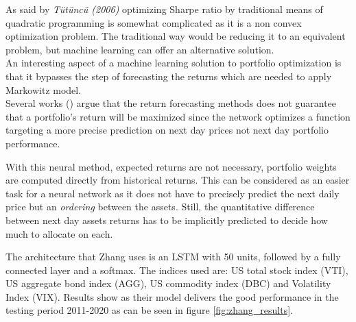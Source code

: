 As said by \textit{T{\"u}t{\"u}nc{\"u} (2006)} \cite{cornuejols2006optimization} optimizing Sharpe ratio by traditional means of quadratic programming is somewhat complicated as it is a non convex optimization problem. The traditional way would be reducing it to an equivalent problem, but machine learning can offer an alternative solution. \\


An interesting aspect of a machine learning solution to portfolio optimization is that it bypasses the step of forecasting the returns which are needed to apply Markowitz model. \\
Several works (\cite{moody2001learning, moody1998performance, zhang2019deep}) argue that the return forecasting methods does not guarantee that a portfolio's return will be maximized since the network optimizes a function targeting a more precise prediction on next day prices not next day portfolio performance.

\hfill \break

With this neural method, expected returns are not necessary, portfolio weights are computed directly from historical returns. This can be considered as an easier task for a neural network as it does not have to precisely predict the next daily price but an \textit{ordering} between the assets. Still, the quantitative difference between next day assets returns has to be implicitly predicted to decide how much to allocate on each.

\hfill \break

The architecture that Zhang uses is an LSTM with 50 units, followed by a fully connected layer and a softmax. The indices used are: US total stock index (VTI), US aggregate bond index (AGG), US commodity index (DBC) and Volatility Index (VIX). 
Results show as their model delivers the good performance in the testing period 2011-2020 as can be seen in figure \ref{fig:zhang_results}.

